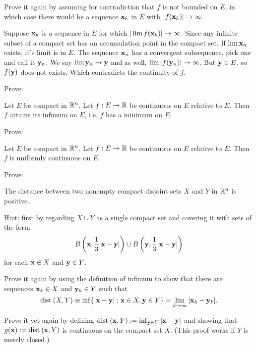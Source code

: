\medskip


\noindent
Prove it again by assuming for contradiction that $f$ is not bounded on $E$, in which case there would be a sequence $\mathbf{x}_k$ in $E$ with $|f(\mathbf{x}_k)| \to \infty$.

Suppose $\mathbf{x}_k$ is a sequence in $E$ for which $|\lim f(\mathbf{x}_k)| \to \infty$. Since any infinite subset of a compact set has an accumulation point in the compact set. If $\lim \mathbf{x}_n$ exists, it's limit is in $E$. The sequence $\mathbf{x}_n$ has a convergent subsequence, pick one and call it $\mathbf{y}_n$. We say $\lim \mathbf{y}_n \to \mathbf{y}$ and as well, $\lim |f(\mathbf{y}_n)| \to \infty$. But $\mathbf{y} \in E$, so $f(\mathbf{y})$ does not exists. Which contradicts the continuity of $f$.

\medskip

\noindent
Prove:
\begin{thm}%
Let $E$ be compact in $\mathbb{R}^n$.  Let $f : E \to \mathbb{R}$ be continuous on $E$ relative to $E$.  Then $f$ attains its infimum on $E$, i.e. $f$ has a minimum on $E$.
\end{thm}

\medskip

\noindent
Prove:
\begin{thm}%
Let $E$ be compact in $\mathbb{R}^n$.  Let $f : E \to \mathbb{R}$ be continuous on $E$ relative to $E$.  Then $f$ is uniformly continuous on $E$.
\end{thm}

\medskip

\noindent
Prove:
\begin{thm}%
The distance between two nonempty compact disjoint sets $X$ and $Y$ in $\mathbb{R}^n$ is positive.
\end{thm}
\noindent
Hint: first by regarding $X \cup Y$ as a single compact set and covering it with sets of the form
\begin{equation*}
  B \left(\mathbf{x},\frac{1}{3}|\mathbf{x} - \mathbf{y}|\right) \cup B \left(\mathbf{y},\frac{1}{3}|\mathbf{x} - \mathbf{y}|\right)
\end{equation*}
for each $\mathbf{x} \in X$ and $\mathbf{y} \in Y$.

\medskip

\noindent
Prove it again by using the definition of infimum to show that there are sequences $\mathbf{x}_k \in X$ and $\mathbf{y}_k \in Y$ such that
\begin{equation*}
  \mathrm{dist}\: (X,Y) \equiv \inf \{ |\mathbf{x} - \mathbf{y}| : \mathbf{x} \in X, \mathbf{y} \in Y \} = \lim_{k \to \infty} |\mathbf{x}_k - \mathbf{y}_k|.
\end{equation*}

\medskip

\noindent
Prove it yet again by defining $\mathrm{dist}\: (\mathbf{x}, Y) := \inf_{\mathbf{y} \in Y} |\mathbf{x} - \mathbf{y}|$ and showing that $g(\mathbf{x}) := \mathrm{dist}\: (\mathbf{x}, Y)$ is continuous on the compact set $X$. (This proof works if $Y$ is merely closed.)



